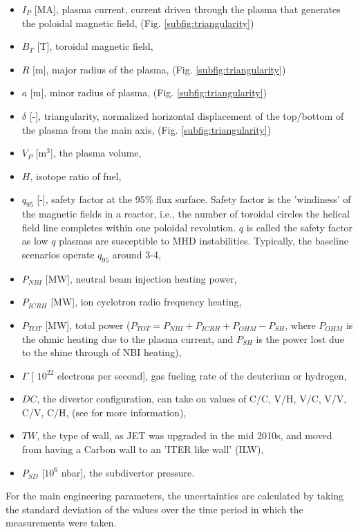 \documentclass[a4paper, twoside, final, 12pt]{article}
\begin{document}
\begin{itemize}
	\item $I_P$ [MA], plasma current, current driven through the plasma that generates the poloidal magnetic field, (Fig. \ref{subfig:triangularity})
	\item $B_T$ [T], toroidal magnetic field,
	\item $R$ [m], major radius of the plasma, (Fig. \ref{subfig:triangularity})
	\item $a$ [m], minor radius of plasma, (Fig. \ref{subfig:triangularity})
	\item $\delta$ [-], triangularity, normalized horizontal displacement of the top/bottom of the plasma from the main axis, (Fig. \ref{subfig:triangularity})
	\item $V_P$ [m$^3$], the plasma volume,
	\item $H$, isotope ratio of fuel,
	\item $q_{95}$ [-], safety factor at the 95\% flux surface. Safety factor is the 'windiness' of the magnetic fields in a reactor, i.e., the  number of toroidal circles the helical field line completes within one poloidal revolution. $q$ is called the safety factor as low $q$ plasmas are susceptible to MHD instabilities. Typically, the baseline scenarios operate  $q_{95}$ around 3-4,
	\item $P_{NBI}$ [MW], neutral beam injection heating power,
	\item $P_{ICRH}$ [MW], ion cyclotron radio frequency heating, 
	\item $P_{TOT}$ [MW], total power ($P_{TOT} = P_{NBI}+ P_{ICRH} + P_{OHM} - P_{SH}$, where $P_{OHM}$ is the ohmic heating due to the plasma current, and $P_{SH}$ is the power lost due to the shine through of NBI heating),
	\item $\Gamma$ [ $10^{22}$ electrons per second], gas fueling rate of the deuterium or hydrogen,  
	\item $DC$, the divertor configuration, can take on values of C/C, V/H, V/C, V/V, C/V, C/H, (see \cite{Frassinetti_2020} for more information),
	\item $TW$, the type of wall, as JET was upgraded in the mid 2010s, and moved from having a Carbon wall to an 'ITER like wall' (ILW),
	\item $P_{SD}$ [$10^6$ nbar], the subdivertor pressure.
\end{itemize}


For the main engineering parameters, the uncertainties are calculated by taking the standard deviation of the values over the time period in which the measurements were taken. 
\end{document}

